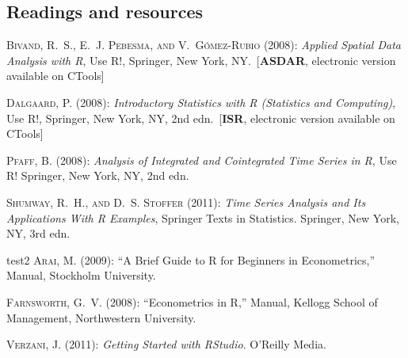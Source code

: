 \subsection{Readings and resources}

\renewcommand\bibname{\normalsize{Recommended readings}}
\begin{thebibliography}{}

 \textsc{Bivand, R.~S., E.~J. Pebesma,  {\small and} V.~G\'{o}mez-Rubio} (2008): \emph{Applied Spatial Data Analysis with R}, Use R!, Springer, New York, NY.~[\textcolor[rgb]{0.00,0.50,0.00}{\textbf{\textsf{ASDAR}}}, electronic version available on CTools]

 \textsc{Dalgaard, P.}  (2008): \emph{Introductory Statistics with R (Statistics and Computing)}, Use R!, Springer, New York, NY, 2nd edn.~[\textcolor[rgb]{0.00,0.50,0.00}{\textbf{\textsf{ISR}}}, electronic version available on CTools]

\textsc{Pfaff, B.}  (2008): \emph{Analysis of Integrated and Cointegrated Time Series in R}, Use R! Springer, New York, NY, 2nd edn.

\textsc{Shumway, R.~H.,  {\small and} D.~S. Stoffer}  (2011): \emph{Time Series Analysis and Its Applications With R Examples}, Springer Texts in Statistics. Springer, New York, NY, 3rd edn.
\end{thebibliography}

\renewcommand\bibname{\normalsize{Getting started with R}}
\begin{thebibliography}{test2}
 \textsc{Arai, M.}  (2009): ``A Brief Guide to \textsf{R} for Beginners in Econometrics,'' Manual, Stockholm University.

 \textsc{Farnsworth, G.~V.}  (2008): ``Econometrics in \textsf{R},'' Manual, Kellogg  School of Management, Northwestern University.

\textsc{Verzani, J.}  (2011): \emph{Getting Started with RStudio}. O'Reilly Media.
\end{thebibliography}

